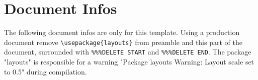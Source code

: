 \chapter{Document Infos}
The following document infos are only for this template. Using a production
document remove \verb|\usepackage{layouts}| from preamble and this part of the
document, surrounded with \verb+%%%DELETE START+ and \verb+%%%DELETE END+.
The package "layouts" is responsible for a warning "Package layouts Warning:
Layout scale set to 0.5" during compilation.\\

\renewcommand{\pagevalues}{%
Actual page layout values.\\
\twtabular{l l}{
    \texttt{\bs paperheight} = \prntlen{\paperheight}  &
    \texttt{\bs paperwidth}  = \prntlen{\paperwidth}   \\
    \texttt{\bs hoffset}        = \prntlen{\hoffset}        &
    \texttt{\bs voffset}        = \prntlen{\voffset}        \\
    \texttt{\bs evensidemargin} = \prntlen{\evensidemargin} &
    \texttt{\bs oddsidemargin}  = \prntlen{\oddsidemargin}  \\
    \texttt{\bs topmargin}      = \prntlen{\topmargin}      &
    \texttt{\bs headheight}     = \prntlen{\headheight}     \\
    \texttt{\bs headsep}        = \prntlen{\headsep}        &
    \texttt{\bs textheight}     = \prntlen{\textheight}     \\
    \texttt{\bs textwidth}      = \prntlen{\textwidth}      &
    \texttt{\bs footskip}       = \prntlen{\footskip}       \\
    \texttt{\bs marginparsep}   = \prntlen{\marginparsep}   &
    \texttt{\bs marginparpush}  = \prntlen{\marginparpush}  \\
    \texttt{\bs columnsep}      = \prntlen{\columnsep}      &
    \texttt{\bs columnseprule}  = \prntlen{\columnseprule}  \\
    \texttt{\bs marginparwidth}  = \prntlen{\marginparwidth}  \\
    1em = \prntlen{1em}  & 1ex = \prntlen{1ex} \\
}
}

